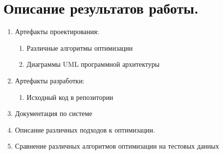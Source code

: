 \documentclass[12pt]{article}
\begin{document}
    \section{Описание результатов работы.}
        \begin{enumerate}\itemsep1pt \parskip0pt 
        	\item Артефакты проектирования:
            	\begin{enumerate}\itemsep1pt \parskip0pt  
            	    \item Различные алгоритмы оптимизации
            	    \item Диаграммы UML программной архитектуры
            	\end{enumerate}
        	\item Артефакты разработки:
            	\begin{enumerate}\itemsep1pt \parskip0pt  
            	    \item Исходный код в репозитории
            	\end{enumerate}
    	    \item Документация по системе
    	    \item Описание различных подходов к оптимизации.
    	    \item Сравнение различных алгоритмов оптимизации на тестовых данных
        \end{enumerate}
\end{document}
